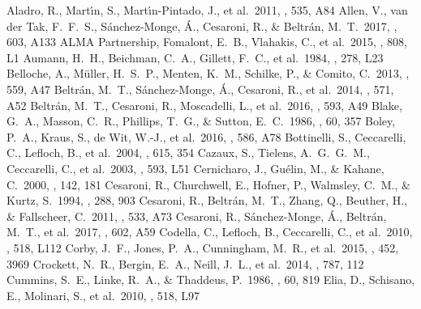 \documentclass{aa}
\begin{document}
\begin{thebibliography}{}

 Aladro, R., Mart{\'{\i}}n, S., Mart{\'{\i}}n-Pintado, J., et al.\ 2011, \aap, 535, A84 
 Allen, V., van der Tak, F.~F.~S., S{\'a}nchez-Monge, {\'A}., Cesaroni, R., \& Beltr{\'a}n, M.~T.\ 2017, \aap, 603, A133 
 ALMA Partnership, Fomalont, E.~B., Vlahakis, C., et al.\ 2015, \apjl, 808, L1 
 Aumann, H.~H., Beichman, C.~A., Gillett, F.~C., et al.\ 1984, \apjl, 278, L23 
 Belloche, A., M{\"u}ller, H.~S.~P., Menten, K.~M., Schilke, P., \& Comito, C.\ 2013, \aap, 559, A47 
 Beltr{\'a}n, M.~T., S{\'a}nchez-Monge, {\'A}., Cesaroni, R., et al.\ 2014, \aap, 571, A52 
 Beltr{\'a}n, M.~T., Cesaroni, R., Moscadelli, L., et al.\ 2016, \aap, 593, A49 
 Blake, G.~A., Masson, C.~R., Phillips, T.~G., \& Sutton, E.~C.\ 1986, \apjs, 60, 357 
 Boley, P.~A., Kraus, S., de Wit, W.-J., et al.\ 2016, \aap, 586, A78 
 Bottinelli, S., Ceccarelli, C., Lefloch, B., et al.\ 2004, \apj, 615, 354 
 Cazaux, S., Tielens, A.~G.~G.~M., Ceccarelli, C., et al.\ 2003, \apjl, 593, L51 
 Cernicharo, J., Gu{\'e}lin, M., \& Kahane, C.\ 2000, \aaps, 142, 181 
 Cesaroni, R., Churchwell, E., Hofner, P., Walmsley, C.~M., \& Kurtz, S.\ 1994, \aap, 288, 903 
 Cesaroni, R., Beltr{\'a}n, M.~T., Zhang, Q., Beuther, H., \& Fallscheer, C.\ 2011, \aap, 533, A73 
 Cesaroni, R., S{\'a}nchez-Monge, {\'A}., Beltr{\'a}n, M.~T., et al.\ 2017, \aap, 602, A59 
 Codella, C., Lefloch, B., Ceccarelli, C., et al.\ 2010, \aap, 518, L112 
 Corby, J.~F., Jones, P.~A., Cunningham, M.~R., et al.\ 2015, \mnras, 452, 3969 
 Crockett, N.~R., Bergin, E.~A., Neill, J.~L., et al.\ 2014, \apj, 787, 112 
 Cummins, S.~E., Linke, R.~A., \& Thaddeus, P.\ 1986, \apjs, 60, 819 
 Elia, D., Schisano, E., Molinari, S., et al.\ 2010, \aap, 518, L97 

\end{thebibliography}
\end{document}
